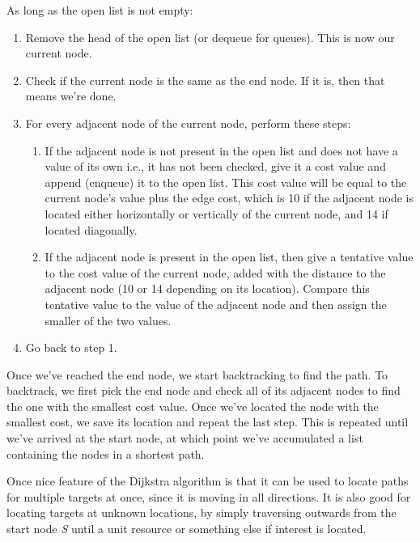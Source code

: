 \documentclass[12pt, a4paper]{article}
\begin{document}
As long as the open list is not empty:

\begin{enumerate}
	\item Remove the head of the open list (or dequeue for queues). This is now
	our current node.
	\item Check if the current node is the same as the end node. If it is, then
	that means we're done.
	\item For every adjacent node of the current node, perform these steps:
	\begin{enumerate}
		\item If the adjacent node is not present in the open list and does not
		have a value of its own i.e., it has not been checked, give it a cost
		value and append (enqueue) it to the open list. This cost value will be
		equal to the current node's value plus the edge cost, which is 10 if the
		adjacent node is located either horizontally or vertically of the current
		node, and 14 if located diagonally.
		\item If the adjacent node is present in the open list, then give a
		tentative value to the cost value of the current node, added with the
		distance to the adjacent node (10 or 14 depending on its location).
		Compare this tentative value to the value of the adjacent node and then
		assign the smaller of the two values.
	\end{enumerate}
	\item Go back to step 1.
\end{enumerate}

Once we've reached the end node, we start backtracking to find the path. To backtrack, we first
pick the end node and check all of its adjacent nodes to find the one with the smallest cost value. Once we've
located the node with the smallest cost, we save its location and repeat the last step. This is repeated until we've arrived
at the start node, at which point we've accumulated a list containing the nodes in a shortest path.


Once nice feature of the Dijkstra algorithm is that it can be used to locate
paths for multiple targets at once, since it is moving in all directions. It is
also good for locating targets at unknown locations, by simply traversing
outwards from the start node \textit{S} until a unit resource or something else
if interest is located.
\end{document}
